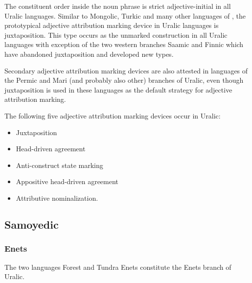 The constituent order inside the noun phrase is strict adjective-initial in all Uralic languages. Similar to Mongolic, Turkic and many other languages of , the prototypical adjective attribution marking device in Uralic languages is juxtaposition. This type occurs as the unmarked construction in all Uralic languages with exception of the two western branches Saamic and Finnic which have abandoned juxtaposition and developed new types.

Secondary adjective attribution marking devices are also attested in languages of the Permic and Mari (and probably also other) branches of Uralic, even though juxtaposition is used in these languages as the default strategy for adjective attribution marking.

The following five adjective attribution marking devices occur in Uralic:
\begin{itemize}
\item Juxtaposition
\item Head-driven agreement
\item Anti-construct state marking
\item Appositive head-driven agreement
\item Attributive nominalization.
\end{itemize}

\subsection{Samoyedic}
\subsubsection{Enets}
The two languages Forest and Tundra Enets constitute the Enets branch of Uralic.

